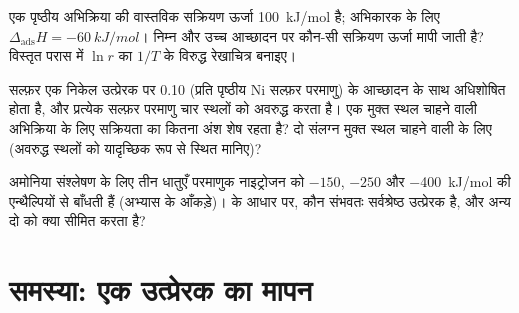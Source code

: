 \begin{exercise}[$\star\star\star$]\label{exo:b3:surfaces-catalysis:10}
एक पृष्ठीय अभिक्रिया की वास्तविक सक्रियण ऊर्जा \qty{100}{kJ/mol} है; अभिकारक के लिए
$\Delta_{\mathrm{ads}}H = \qty{-60}{kJ/mol}$। निम्न और उच्च आच्छादन पर कौन-सी सक्रियण ऊर्जा मापी जाती है?
विस्तृत परास में $\ln r$ का $1/T$ के विरुद्ध रेखाचित्र बनाइए।
\end{exercise}

\begin{exercise}[$\star\star\star$]\label{exo:b3:surfaces-catalysis:11}
सल्फ़र एक निकेल उत्प्रेरक पर 0.10 (प्रति पृष्ठीय Ni सल्फ़र परमाणु) के आच्छादन के साथ
अधिशोषित होता है, और प्रत्येक सल्फ़र परमाणु चार स्थलों को अवरुद्ध करता है। एक मुक्त स्थल चाहने वाली
अभिक्रिया के लिए सक्रियता का कितना अंश शेष रहता है? दो संलग्न मुक्त स्थल चाहने वाली के लिए (अवरुद्ध
स्थलों को यादृच्छिक रूप से स्थित मानिए)?
\end{exercise}

\begin{exercise}[$\star\star\star$]\label{exo:b3:surfaces-catalysis:12}
अमोनिया संश्लेषण के लिए तीन धातुएँ परमाणुक नाइट्रोजन को
$-150$, $-250$ और \qty{-400}{kJ/mol} की एन्थैल्पियों से बाँधती हैं (अभ्यास के आँकड़े)।  के आधार पर, कौन संभवतः सर्वश्रेष्ठ उत्प्रेरक है, और अन्य दो को क्या सीमित करता है?
\end{exercise}

\section{समस्या: एक उत्प्रेरक का मापन}

